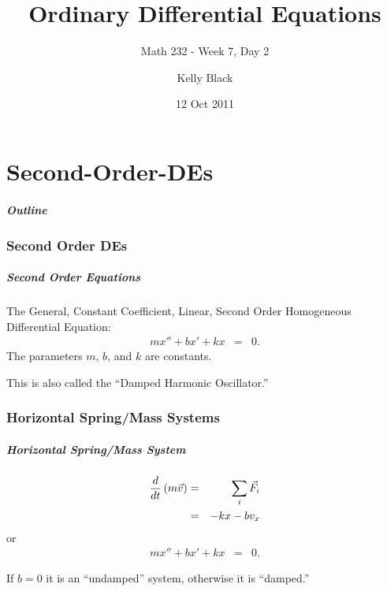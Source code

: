 \part{Second-Order-DEs}


\title{Ordinary Differential Equations}
\subtitle{Math 232 - Week 7, Day 2}

\author{Kelly Black}
\date{12 Oct 2011}

\begin{frame}
  \titlepage
\end{frame}

\begin{frame}
  \frametitle{Outline}
\end{frame}


\section{Second Order DEs}


\begin{frame}
  \frametitle{Second Order Equations}

  The General, Constant Coefficient, Linear, Second Order Homogeneous
  Differential Equation:
  \begin{eqnarray*}
    m x'' + b x' + kx & = & 0.
  \end{eqnarray*}
  The parameters $m$, $b$, and $k$ are constants.

  This is also called the ``Damped Harmonic Oscillator.''

\end{frame}

\section{Horizontal Spring/Mass Systems}

\begin{frame}
  \frametitle{Horizontal Spring/Mass System}

  \begin{eqnarray*}
    \frac{d}{dt} \left( m \vec{v} \right) & = & \sum_i \vec{F}_i \\
    & = & -kx - bv_x 
  \end{eqnarray*}
  or
  \begin{eqnarray*}
    mx'' + bx' + kx & = & 0.
  \end{eqnarray*}

  If $b=0$ it is an ``undamped'' system, otherwise it is ``damped.''

\end{frame}


